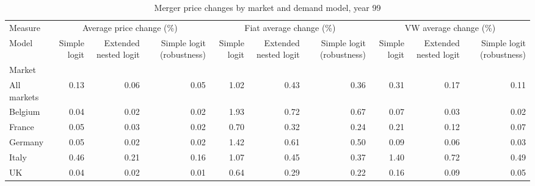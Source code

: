 \begin{table}
\caption{Merger price changes by market and demand model, year 99}
\label{tab:merger_overview_pivot}
\begin{tabular}{lrrrrrrrrr}
\toprule
Measure & \multicolumn{3}{c}{Average price change (\%)} & \multicolumn{3}{c}{Fiat average change (\%)} & \multicolumn{3}{c}{VW average change (\%)} \\
Model & Simple logit & Extended nested logit & Simple logit (robustness) & Simple logit & Extended nested logit & Simple logit (robustness) & Simple logit & Extended nested logit & Simple logit (robustness) \\
Market &  &  &  &  &  &  &  &  &  \\
\midrule
All markets & 0.13 & 0.06 & 0.05 & 1.02 & 0.43 & 0.36 & 0.31 & 0.17 & 0.11 \\
Belgium & 0.04 & 0.02 & 0.02 & 1.93 & 0.72 & 0.67 & 0.07 & 0.03 & 0.02 \\
France & 0.05 & 0.03 & 0.02 & 0.70 & 0.32 & 0.24 & 0.21 & 0.12 & 0.07 \\
Germany & 0.05 & 0.02 & 0.02 & 1.42 & 0.61 & 0.50 & 0.09 & 0.06 & 0.03 \\
Italy & 0.46 & 0.21 & 0.16 & 1.07 & 0.45 & 0.37 & 1.40 & 0.72 & 0.49 \\
UK & 0.04 & 0.02 & 0.01 & 0.64 & 0.29 & 0.22 & 0.16 & 0.09 & 0.05 \\
\bottomrule
\end{tabular}
\end{table}
